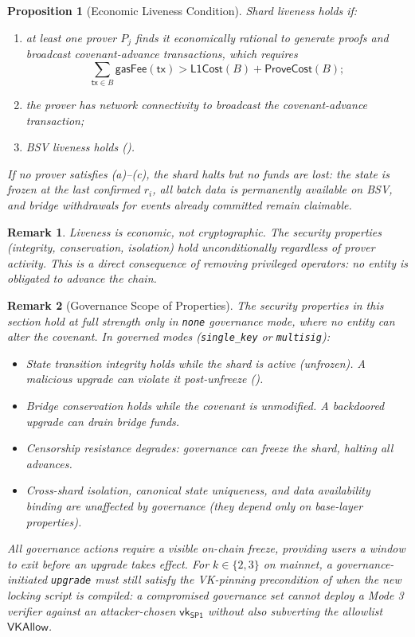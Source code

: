 \documentclass[11pt,a4paper]{article}
\newtheorem{proposition}[theorem]{Proposition}
\newtheorem{remark}{Remark}[section]
\newcommand{\SPone}{\mathsf{SP1}}
\newcommand{\vkSP}{\mathsf{vk}_{\SPone}}           %
\newcommand{\VKAllow}{\mathsf{VKAllow}}            %
\begin{document}
\begin{proposition}[Economic Liveness Condition]\label{prop:liveness}
Shard liveness holds if:
\begin{enumerate}[nosep,label=(\alph*)]
    \item at least one prover $P_j$ finds it economically rational to generate proofs and broadcast covenant-advance transactions, which requires
\[
    \sum_{\mathsf{tx} \in B} \mathsf{gasFee}(\mathsf{tx}) > \mathsf{L1Cost}(B) + \mathsf{ProveCost}(B);
\]
    \item the prover has network connectivity to broadcast the covenant-advance transaction;
    \item BSV liveness holds ().
\end{enumerate}
If no prover satisfies (a)--(c), the shard halts but no funds are lost: the state is frozen at the last confirmed $r_i$, all batch data is permanently available on BSV, and bridge withdrawals for events already committed remain claimable.
\end{proposition}

\begin{remark}
Liveness is economic, not cryptographic. The security properties (integrity, conservation, isolation) hold unconditionally regardless of prover activity. This is a direct consequence of removing privileged operators: no entity is obligated to advance the chain.
\end{remark}

\begin{remark}[Governance Scope of Properties]\label{rem:gov-scope}
The security properties in this section hold at full strength only in \texttt{none} governance mode, where no entity can alter the covenant. In governed modes (\texttt{single\_key} or \texttt{multisig}):
\begin{itemize}[nosep]
    \item \emph{State transition integrity} holds while the shard is active (unfrozen). A malicious upgrade can violate it post-unfreeze ().
    \item \emph{Bridge conservation} holds while the covenant is unmodified. A backdoored upgrade can drain bridge funds.
    \item \emph{Censorship resistance} degrades: governance can freeze the shard, halting all advances.
    \item \emph{Cross-shard isolation}, \emph{canonical state uniqueness}, and \emph{data availability binding} are unaffected by governance (they depend only on base-layer properties).
\end{itemize}
All governance actions require a visible on-chain freeze, providing users a window to exit before an upgrade takes effect. For $k \in \{2, 3\}$ on mainnet, a governance-initiated \texttt{upgrade} must still satisfy the VK-pinning precondition of  when the \emph{new} locking script is compiled: a compromised governance set cannot deploy a Mode 3 verifier against an attacker-chosen $\vkSP$ without also subverting the allowlist $\VKAllow$.
\end{remark}
\end{document}
